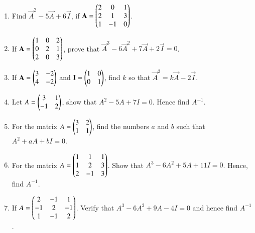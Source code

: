 \begin{enumerate}[label=\thesubsection.\arabic*,ref=\thesubsection.\theenumi]
\item Find $\vec{A}^2-5\vec{A}+6\vec{I}$, if $\mathbf{A}=\begin{pmatrix}
2 & 0 & 1 \\ 2 & 1 & 3 \\ 1 & -1 & 0\end{pmatrix}$.
\item If $\mathbf{A}=\begin{pmatrix}1 & 0 & 2 \\ 0 & 2 & 1 \\ 2 & 0 & 3\end{pmatrix}$, prove that $\vec{A}^3-6\vec{A}^2+7\vec{A}+2\vec{I}=0$.
\item If $\mathbf{A}=\begin{pmatrix}3 & -2 \\ 4 & -2\end{pmatrix}$ and $\mathbf{I}=\begin{pmatrix}1 & 0 \\ 0 & 1\end{pmatrix}$, find $k$ so that $\vec{A}^2=k\vec{A}-2\vec{I}$.
\item Let $A=\begin{pmatrix}3 & 1 \\ -1 & 2\end{pmatrix}$, show that $A^2-5A+7I=0$. Hence find $A^{-1}$.
\item For the matrix $A=\begin{pmatrix}3 & 2 \\ 1 & 1\end{pmatrix}$, find the numbers $a$ and $b$ such that $A^2+aA+bI=0$.
\item For the matrix $A=\begin{pmatrix}1 & 1 & 1 \\ 1 & 2 & 3 \\ 2 & -1 & 3\end{pmatrix}$. Show that $A^3-6A^2+5A+11I=0$. Hence, find $A^{-1}$.
\item If $A=\begin{pmatrix}2 & -1 & 1 \\ -1 & 2 & -1 \\ 1 & -1 & 2\end{pmatrix}$. Verify that $A^3-6A^2+9A-4I=0$ and hence find $A^{-1}$.
\end{enumerate}
